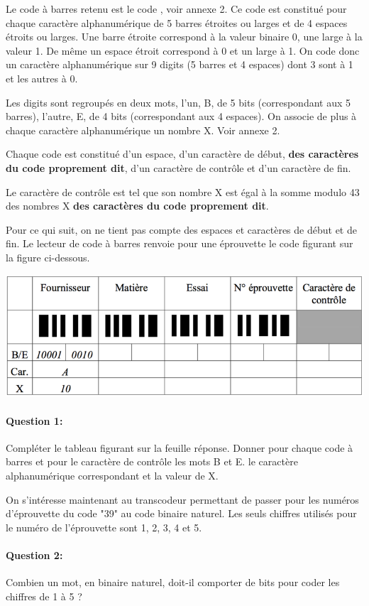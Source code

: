 Le code à barres retenu est le code  \fg, voir annexe 2. Ce code est constitué pour chaque caractère alphanumérique de 5 barres étroites ou larges et de 4 espaces étroits ou larges. Une barre étroite correspond à la valeur binaire 0, une large à la valeur 1. De même un espace étroit correspond à 0 et un large à 1. On code donc un caractère alphanumérique sur 9 digits (5 barres et 4 espaces) dont 3 sont à 1 et les autres à 0.

Les digits sont regroupés en deux mots, l'un, B, de 5 bits (correspondant aux 5 barres), l'autre, E, de 4 bits (correspondant aux 4 espaces). On associe de plus à chaque caractère alphanumérique un nombre X. Voir annexe 2.

Chaque code est constitué d'un espace, d'un caractère de début, \textbf{des caractères du code proprement dit}, d'un caractère de contrôle et d'un caractère de fin.

Le caractère de contrôle est tel que son nombre X est égal à la somme modulo 43 des nombres X \textbf{des caractères du code proprement dit}.

Pour ce qui suit, on ne tient pas compte des espaces et caractères de début et de fin. Le lecteur de code à barres renvoie pour une éprouvette le code figurant sur la figure ci-dessous.

\begin{center}
 \includegraphics[width=0.7\linewidth]{img/figure03}
\end{center}

\paragraph{Question 1:} Compléter le tableau figurant sur la feuille réponse. Donner pour chaque code à barres et pour le caractère de contrôle les mots B et E. le caractère alphanumérique correspondant et la valeur de X. 

On s'intéresse maintenant au transcodeur permettant de passer pour les numéros d'éprouvette du code "39" au code binaire naturel. 
Les seuls chiffres utilisés pour le numéro de l'éprouvette sont 1, 2, 3, 4 et 5. 

\paragraph{Question 2:} Combien un mot, en binaire naturel, doit-il comporter de bits pour coder les chiffres de 1 à 5 ? 

